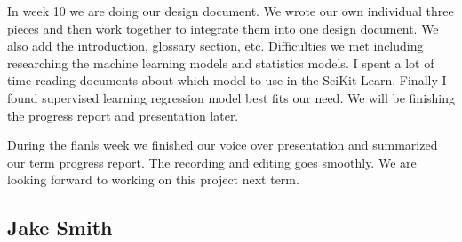 \documentclass[letterpaper, 10pt,titlepage]{article}
\begin{document}
\par In week 10 we are doing our design document. We wrote our own individual three pieces and then work together to integrate them into one design document. We also add the introduction, glossary section, etc. Difficulties we met including researching the machine learning models and statistics models. I spent a lot of time reading documents about which model to use in the SciKit-Learn. Finally I found supervised learning regression model best fits our need. We will be finishing the progress report and presentation later.

\par During the fianls week we finished our voice over presentation and summarized our term progress report. The recording and editing goes smoothly. We are looking forward to working on this project next term.

\subsection{Jake Smith}
\end{document}
